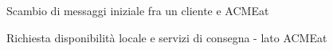 \documentclass[11pt]{article} %
\begin{document}
\begin{figure}[!ht]
\begin{center}
\caption{Scambio di messaggi iniziale fra un cliente e ACMEat}
\end{center}
\end{figure}

\begin{figure}[!ht]
\begin{center}
\caption{Richiesta disponibilità locale e servizi di consegna - lato ACMEat}
\end{center}
\end{figure}
\end{document}
